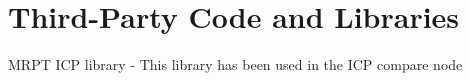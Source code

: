 \chapter{Third-Party Code and Libraries}

%
%
%
%
%
MRPT ICP library - This library has been used in the ICP compare node
